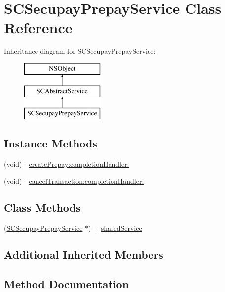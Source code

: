 \hypertarget{interface_s_c_secupay_prepay_service}{}\section{S\+C\+Secupay\+Prepay\+Service Class Reference}
\label{interface_s_c_secupay_prepay_service}
Inheritance diagram for S\+C\+Secupay\+Prepay\+Service\+:\begin{figure}[H]
\begin{center}
\leavevmode
\includegraphics[height=3.000000cm]{interface_s_c_secupay_prepay_service}
\end{center}
\end{figure}
\subsection*{Instance Methods}
\begin{DoxyCompactItemize}
\item 
(void) -\/ \hyperlink{interface_s_c_secupay_prepay_service_a3c08aad06fd64def47a58c0d2d675d11}{create\+Prepay\+:completion\+Handler\+:}
\item 
(void) -\/ \hyperlink{interface_s_c_secupay_prepay_service_a8dcb7a521d8d5b6ee5bfd3e9d655fd55}{cancel\+Transaction\+:completion\+Handler\+:}
\end{DoxyCompactItemize}
\subsection*{Class Methods}
\begin{DoxyCompactItemize}
\item 
(\hyperlink{interface_s_c_secupay_prepay_service}{S\+C\+Secupay\+Prepay\+Service} $\ast$) + \hyperlink{interface_s_c_secupay_prepay_service_add0e02ac01b3d588c08959fed167fe79}{shared\+Service}
\end{DoxyCompactItemize}
\subsection*{Additional Inherited Members}


\subsection{Method Documentation}
